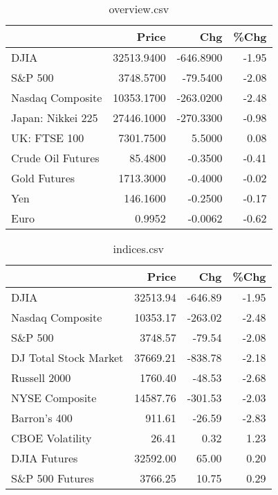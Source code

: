 \documentclass{article}%
\begin{document}
\begin{table}[htbp]%
\caption{overview.csv}%
\centering%
\begin{adjustbox}{width=1\textwidth}%
\begin{tabular}{lrrr}
\toprule
                  &      Price &       Chg &  \%Chg \\
\midrule
             DJIA & 32513.9400 & -646.8900 & -1.95 \\
          S\&P 500 &  3748.5700 &  -79.5400 & -2.08 \\
 Nasdaq Composite & 10353.1700 & -263.0200 & -2.48 \\
Japan: Nikkei 225 & 27446.1000 & -270.3300 & -0.98 \\
     UK: FTSE 100 &  7301.7500 &    5.5000 &  0.08 \\
Crude Oil Futures &    85.4800 &   -0.3500 & -0.41 \\
     Gold Futures &  1713.3000 &   -0.4000 & -0.02 \\
              Yen &   146.1600 &   -0.2500 & -0.17 \\
             Euro &     0.9952 &   -0.0062 & -0.62 \\
\bottomrule
\end{tabular}
%
\end{adjustbox}%
\end{table}

%


\begin{table}[htbp]%
\caption{indices.csv}%
\centering%
\begin{adjustbox}{width=1\textwidth}%
\begin{tabular}{lrrr}
\toprule
                      &    Price &     Chg &  \%Chg \\
\midrule
                 DJIA & 32513.94 & -646.89 & -1.95 \\
     Nasdaq Composite & 10353.17 & -263.02 & -2.48 \\
              S\&P 500 &  3748.57 &  -79.54 & -2.08 \\
DJ Total Stock Market & 37669.21 & -838.78 & -2.18 \\
         Russell 2000 &  1760.40 &  -48.53 & -2.68 \\
       NYSE Composite & 14587.76 & -301.53 & -2.03 \\
         Barron's 400 &   911.61 &  -26.59 & -2.83 \\
      CBOE Volatility &    26.41 &    0.32 &  1.23 \\
         DJIA Futures & 32592.00 &   65.00 &  0.20 \\
      S\&P 500 Futures &  3766.25 &   10.75 &  0.29 \\
\bottomrule
\end{tabular}
%
\end{adjustbox}%
\end{table}
\end{document}
